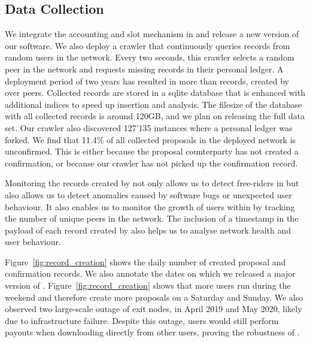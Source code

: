 \subsection{Data Collection}
We integrate the accounting and slot mechanism in \Tribler{} and release a new version of our software.
We also deploy a crawler that continuously queries \ModelName{} records from random users in the \Tribler{} network.
Every two seconds, this crawler selects a random peer in the \ModelName{} network and requests missing records in their personal ledger.
A deployment period of two years has resulted in more than \TrialRecords{} records, created by over \TrialUsers{} peers.
Collected records are stored in a sqlite database that is enhanced with additional indices to speed up insertion and analysis.
The filesize of the database with all collected records is around 120GB, and we plan on releasing the full data set.
Our crawler also discovered 127'135 instances where a personal ledger was forked.
We find that 11.4\% of all collected proposals in the deployed \ModelName{} network is unconfirmed.
This is either because the proposal counterparty has not created a confirmation, or because our crawler has not picked up the confirmation record.

Monitoring the records created by \ModelName{} not only allows us to detect free-riders in \Tribler{} but also allows us to detect anomalies caused by software bugs or unexpected user behaviour.
It also enables us to monitor the growth of users within \Tribler{} by tracking the number of unique peers in the \ModelName{} network.
The inclusion of a timestamp in the payload of each record created by \ModelName{} also helps us to analyse network health and user behaviour.

Figure~\ref{fig:record_creation} shows the daily number of created proposal and confirmation records.
We also annotate the dates on which we released a major version of \Tribler{}.
Figure~\ref{fig:record_creation} shows that more users run \Tribler{} during the weekend and therefore create more proposals on a Saturday and Sunday.
We also observed two large-scale outage of exit nodes, in April 2019 and May 2020, likely due to infrastructure failure.
Despite this outage, users would still perform payouts when downloading directly from other \Tribler{} users, proving the robustness of \ModelName{}.


